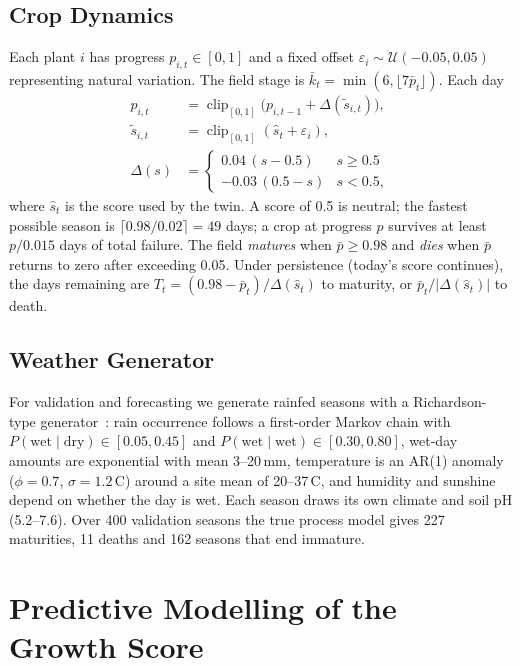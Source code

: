 \documentclass[conference]{IEEEtran}
\begin{document}
\subsection{Crop Dynamics}
Each plant $i$ has progress $p_{i,t} \in [0,1]$ and a fixed offset
$\varepsilon_i \sim \mathcal{U}(-0.05, 0.05)$ representing natural variation. The field stage is
$\bar k_t = \min(6, \lfloor 7\bar p_t \rfloor)$. Each day
\begin{align}
p_{i,t} &= \operatorname{clip}_{[0,1]}\!\big(p_{i,t-1} + \Delta(\tilde s_{i,t})\big),\\
\tilde s_{i,t} &= \operatorname{clip}_{[0,1]}(\hat s_t + \varepsilon_i),\\
\Delta(s) &= \begin{cases} 0.04\,(s - 0.5) & s \ge 0.5\\ -0.03\,(0.5 - s) & s < 0.5,\end{cases}\label{eq:delta}
\end{align}
where $\hat s_t$ is the score used by the twin. A score of 0.5 is neutral; the fastest possible
season is $\lceil 0.98/0.02 \rceil = 49$ days; a crop at progress $p$ survives at least $p/0.015$
days of total failure. The field \emph{matures} when $\bar p \ge 0.98$ and \emph{dies} when
$\bar p$ returns to zero after exceeding 0.05. Under persistence (today's score continues), the
days remaining are $T_t = (0.98 - \bar p_t)/\Delta(\hat s_t)$ to maturity, or $\bar p_t/|\Delta(\hat s_t)|$
to death.

\subsection{Weather Generator}
For validation and forecasting we generate rainfed seasons with a Richardson-type
generator~\cite{richardson1981stochastic}: rain occurrence follows a first-order Markov chain with
$P(\text{wet}\mid\text{dry}) \in [0.05, 0.45]$ and $P(\text{wet}\mid\text{wet}) \in [0.30, 0.80]$,
wet-day amounts are exponential with mean 3--20\,mm, temperature is an AR(1) anomaly
($\phi = 0.7$, $\sigma = 1.2$\,\textdegree C) around a site mean of 20--37\,\textdegree C, and
humidity and sunshine depend on whether the day is wet. Each season draws its own climate and
soil pH (5.2--7.6). Over 400 validation seasons the true process model gives 227
maturities, 11 deaths and 162 seasons that end immature.

\section{Predictive Modelling of the Growth Score}\label{sec:model}
\end{document}
